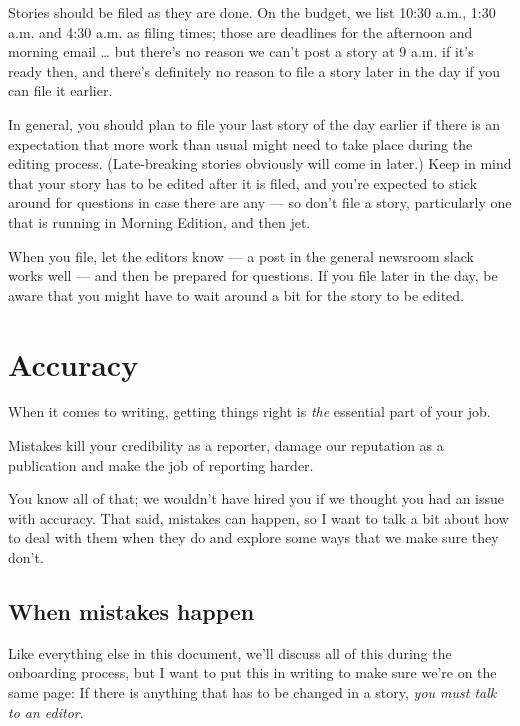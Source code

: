 \documentclass[
  11pt,
  american,
  letterpaperpaper,
  extrafontsizes,onecolumn,openright
  ]{memoir}
\begin{document}
Stories should be filed as they are done. On the budget, we list 10:30 a.m., 1:30 a.m. and 4:30 a.m. as filing times; those are deadlines for the afternoon and morning email \ldots{} but there's no reason we can't post a story at 9 a.m. if it's ready then, and there's definitely no reason to file a story later in the day if you can file it earlier.

In general, you should plan to file your last story of the day earlier if there is an expectation that more work than usual might need to take place during the editing process. (Late-breaking stories obviously will come in later.) Keep in mind that your story has to be edited after it is filed, and you're expected to stick around for questions in case there are any --- so don't file a story, particularly one that is running in Morning Edition, and then jet.

When you file, let the editors know --- a post in the general newsroom slack works well --- and then be prepared for questions. If you file later in the day, be aware that you might have to wait around a bit for the story to be edited.

\hypertarget{accuracy}{%
\chapter{Accuracy}\label{accuracy}}

When it comes to writing, getting things right is \emph{the} essential part of your job.

Mistakes kill your credibility as a reporter, damage our reputation as a publication and make the job of reporting harder.

You know all of that; we wouldn't have hired you if we thought you had an issue with accuracy. That said, mistakes can happen, so I want to talk a bit about how to deal with them when they do and explore some ways that we make sure they don't.

\hypertarget{when-mistakes-happen}{%
\section*{When mistakes happen}\label{when-mistakes-happen}}

Like everything else in this document, we'll discuss all of this during the onboarding process, but I want to put this in writing to make sure we're on the same page: If there is anything that has to be changed in a story, \emph{you must talk to an editor}.
\end{document}
